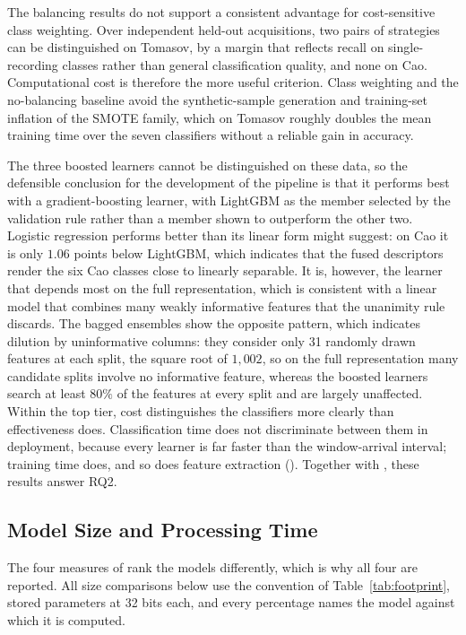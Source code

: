 The balancing results do not support a consistent advantage for cost-sensitive class weighting. Over independent held-out acquisitions, two pairs of strategies can be distinguished on Tomasov, by a margin that reflects recall on single-recording classes rather than general classification quality, and none on Cao. Computational cost is therefore the more useful criterion. Class weighting and the no-balancing baseline avoid the synthetic-sample generation and training-set inflation of the SMOTE family, which on Tomasov roughly doubles the mean training time over the seven classifiers without a reliable gain in accuracy.

The three boosted learners cannot be distinguished on these data, so the defensible conclusion for the development of the pipeline is that it performs best with a gradient-boosting learner, with LightGBM as the member selected by the validation rule rather than a member shown to outperform the other two. Logistic regression performs better than its linear form might suggest: on Cao it is only $1.06$ points below LightGBM, which indicates that the fused descriptors render the six Cao classes close to linearly separable. It is, however, the learner that depends most on the full representation, which is consistent with a linear model that combines many weakly informative features that the unanimity rule discards. The bagged ensembles show the opposite pattern, which indicates dilution by uninformative columns: they consider only 31 randomly drawn features at each split, the square root of $1{,}002$, so on the full representation many candidate splits involve no informative feature, whereas the boosted learners search at least $80\%$ of the features at every split and are largely unaffected. Within the top tier, cost distinguishes the classifiers more clearly than effectiveness does. Classification time does not discriminate between them in deployment, because every learner is far faster than the window-arrival interval; training time does, and so does feature extraction (). Together with , these results answer RQ2.

\subsection{Model Size and Processing Time}
\label{sec:resDiscCost}
The four measures of  rank the models differently, which is why all four are reported. All size comparisons below use the convention of Table~\ref{tab:footprint}, stored parameters at 32 bits each, and every percentage names the model against which it is computed.


